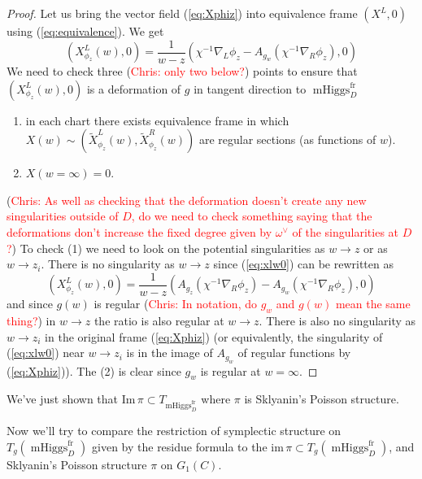 \documentclass[11pt, oneside, reqno]{amsart}
\theoremstyle{definition} \newtheorem{definition}{Definition}[section]
\theoremstyle{definition} \newtheorem{remark}[definition]{Remark}
\theoremstyle{definition} \newtheorem{remarks}[definition]{Remarks}
\theoremstyle{definition} \newtheorem{question}[definition]{Question}
\theoremstyle{definition} \newtheorem*{note}{Note}
\theoremstyle{definition} \newtheorem{example}[definition]{Example}
\theoremstyle{definition} \newtheorem{examples}[definition]{Examples}
\DeclareMathOperator{\mhiggs}{mHiggs}
\newcommand{\fr}{\mathrm{fr}}
\newcommand{\chris}[1]{(\textcolor{red}{Chris: #1})}
\begin{document}
\begin{proof}
  Let us bring the vector field (\ref{eq:Xphiz}) into equivalence frame $(X^{L}, 0)$ using
  (\ref{eq:equivalence}). We get
  \begin{equation}
\label{eq:xlw0}
(X^L_{\phi_z} (w) , 0) =  \frac{1}{w - z} ( \chi^{-1} \nabla_{L} \phi_z  - A_{g_{w}} (\chi^{-1}\nabla_{R} \phi_{z}), 0 )
  \end{equation}
  We need to check three \chris{only two below?} points to ensure that $(X^L_{\phi_z} (w) , 0) $ is a deformation
  of $g$ in tangent direction to $\mhiggs^{\fr}_{D}$
  \begin{enumerate}
  \item in each chart there exists equivalence frame in which $X(w) \sim (\tilde X_{\phi_{z}}^{L}(w), \tilde X_{\phi_{z}}^{R}(w))$  are regular sections (as functions of $w$).
  \item $X(w = \infty) = 0$.
  \end{enumerate}
  \chris{As well as checking that the deformation doesn't create any new singularities outside of $D$, do we need to check something saying that the deformations don't increase the fixed degree given by $\omega^\vee$ of the singularities at $D$?}
  To check (1) we need to look on the potential singularities as $w \to z$ or as $w \to z_i$.
  There is no singularity as $w \to z$ since (\ref{eq:xlw0}) can be rewritten
  as
  \begin{equation}
\label{eq:sklyanin-left}
(X^L_{\phi_z} (w) , 0)  =     \frac{1}{w - z} ( A_{g_z}( \chi^{-1} \nabla_{R} \phi_z)  - A_{g_{w}} (\chi^{-1}\nabla_{R} \phi_{z}),0)
  \end{equation}
  and since $g(w)$ is regular \chris{In notation, do $g_w$ and $g(w)$ mean the same thing?} in $w \to z$ the ratio is also regular at $w \to z$.
  There is also no singularity as $w \to z_i$ in the original frame (\ref{eq:Xphiz}) 
  (or equivalently, the singularity of (\ref{eq:xlw0}) near $w \to z_i$ 
  is in the image of $A_{g_{w}}$ of regular functions by (\ref{eq:Xphiz})).
 The (2) is clear since $g_{w}$ is regular at $w = \infty$. 
\end{proof}

We've just shown that $\mathrm{Im} \, \pi \subset T_{\mhiggs^{\fr}_{D}}$ where
$\pi$ is Sklyanin's Poisson structure. 

Now we'll try to compare the restriction of symplectic
structure on $T_{g}(\mhiggs^{\fr}_{D})$ given by the residue formula to the $\mathrm{im} \, \pi
\subset T_{g}(\mhiggs^{\fr}_D)$, and Sklyanin's Poisson structure $\pi$ on $G_1(C)$. 
\end{document}

